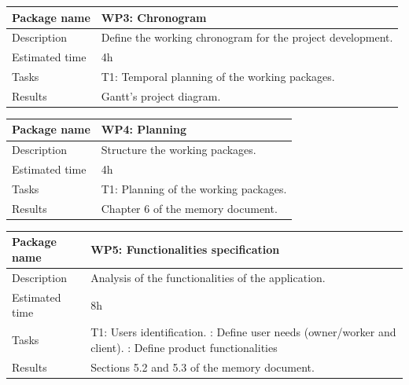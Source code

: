 \documentclass[a4paper, 12pt, oneside]{book}
\begin{document}
\vspace*{16pt}
\begin{tabularx}{\textwidth}{| l | X |}
	\hline
	\rowcolor{rowColor}
	{\semibf Package name}   & {\semibf WP3}: Chronogram                                  \\
	\hline
	{\semibf Description}    & Define the working chronogram for the project development. \\
	\hline
	\rowcolor{rowColor}
	{\semibf Estimated time} & 4h                                                         \\
	\hline
	{\semibf Tasks}          & {\semibf T1}: Temporal planning of the working packages.   \\
	\hline
	\rowcolor{rowColor}
	{\semibf Results}        & Gantt's project diagram.                                   \\
	\hline
\end{tabularx}
\vspace*{16pt}
\begin{tabularx}{\textwidth}{| l | X |}
	\hline
	\rowcolor{rowColor}
	{\semibf Package name}   & {\semibf WP4}: Planning                         \\
	\hline
	{\semibf Description}    & Structure the working packages.                 \\
	\hline
	\rowcolor{rowColor}
	{\semibf Estimated time} & 4h                                              \\
	\hline
	{\semibf Tasks}          & {\semibf T1}: Planning of the working packages. \\
	\hline
	\rowcolor{rowColor}
	{\semibf Results}        & Chapter 6 of the memory document.               \\
	\hline
\end{tabularx}
\vspace*{16pt}
\begin{tabularx}{\textwidth}{| l | X |}
	\hline
	\rowcolor{rowColor}
	{\semibf Package name}   & {\semibf WP5}: Functionalities specification        \\
	\hline
	{\semibf Description}    & Analysis of the functionalities of the application. \\
	\hline
	\rowcolor{rowColor}
	{\semibf Estimated time} & 8h                                                  \\
	\hline
	{\semibf Tasks}          & {\semibf T1}: Users identification.
	\newline {\semibf T2}: Define user needs (owner/worker and client).
	\newline {\semibf T3}: Define product functionalities                          \\
	\hline
	\rowcolor{rowColor}
	{\semibf Results}        & Sections 5.2 and 5.3 of the memory document.        \\
	\hline
\end{tabularx}
\end{document}
